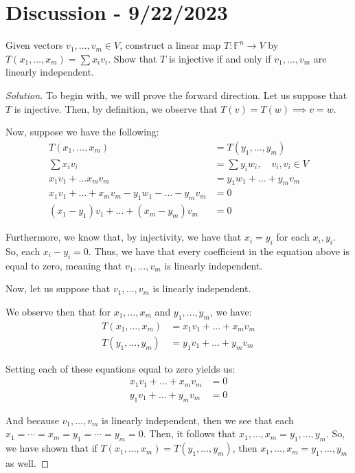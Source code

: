 \documentclass[openany]{book}
\newenvironment{solution}{\begin{proof}[Solution]}{\end{proof}}
\begin{document}
\section{Discussion - 9/22/2023}
\begin{hw}
	Given vectors $v_{1}, \ldots, v_{m} \in V$, construct a linear map $T : \mathbb{F}^{n} \rightarrow V$ by $T(x_{1}, \ldots, x_{m}) = \sum x_{i}v_{i}$. Show that $T$ is injective if and only if $v_{1}, \ldots, v_{m}$ are linearly independent.
\end{hw}
\begin{solution}
	To begin with, we will prove the forward direction. Let us suppose that $T$ is injective. Then, by definition, we observe that $T(v) = T(w) \implies v = w$.
	
	Now, suppose we have the following:
	\begin{align*}
		T(x_{1}, \ldots, x_{m}) &= T(y_{1}, \ldots, y_{m}) \\
		\sum x_{i}v_{i} &= \sum y_{i}w_{i}, \quad v_{i}, v_{i} \in V \\
		x_{1}v_{1} + \ldots x_{m}v_{m} &= y_{1}w_{1} + \ldots + y_{m}v_{m} \\
		x_{1}v_{1} + \ldots + x_{m}v_{m} - y_{1}w_{1} - \ldots - y_{m}v_{m} &= 0 \\
		(x_{1} - y_{1})v_{1} + \ldots + (x_{m} - y_{m})v_{m} &= 0
	\end{align*}

	Furthermore, we know that, by injectivity, we have that $x_{i} = y_{i}$ for each $x_{i}, y_{i}$. So, each $x_{i} - y_{i} = 0$. Thus, we have that every coefficient in the equation above is equal to zero, meaning that $v_{1}, \ldots, v_{m}$ is linearly independent.

	Now, let us suppose that $v_{1}, \ldots, v_{m}$ is linearly independent.
	
	We observe then that for $x_{1}, \ldots, x_{m}$ and $y_{1}, \ldots, y_{m}$, we have:
	\begin{align*}
		T(x_{1}, \ldots, x_{m}) &= x_{1}v_{1} + \ldots + x_{m}v_{m} \\
		T(y_{1}, \ldots, y_{m}) &= y_{1}v_{1} + \ldots + y_{m}v_{m}
	\end{align*}

	Setting each of these equations equal to zero yields us:
	\begin{align*}
		x_{1}v_{1} + \ldots + x_{m}v_{m} &= 0 \\
		y_{1}v_{1} + \ldots + y_{m}v_{m} &= 0
	\end{align*}

	And because $v_{1}, \ldots, v_{m}$ is linearly independent, then we see that each $x_{1} = \cdots = x_{m} = y_{1} = \cdots = y_{m} = 0$. Then, it follows that $x_{1}, \ldots, x_{m} = y_{1}, \ldots, y_{m}$. So, we have shown that if $T(x_{1}, \ldots, x_{m}) = T(y_{1}, \ldots, y_{m})$, then $x_{1}, \ldots, x_{m} = y_{1}, \ldots, y_{m}$ as well.
\end{solution}
\end{document}
